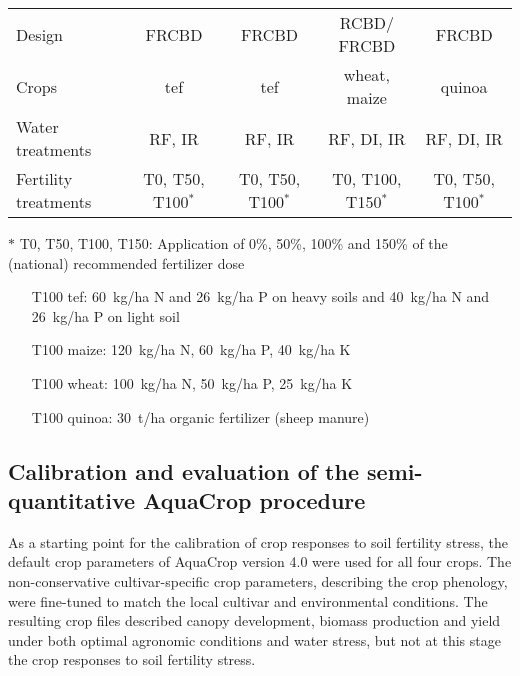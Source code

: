 \begin{landscape}
\begin{table}[htbp]
\begin{threeparttable}
\begin{tabular}{lrrrc}
Design & \multicolumn{1}{c}{FRCBD} & \multicolumn{1}{c}{FRCBD} & \multicolumn{1}{c}{RCBD/ FRCBD} & FRCBD \\
Crops & \multicolumn{1}{c}{tef} & \multicolumn{1}{c}{tef} & \multicolumn{1}{c}{wheat, maize} & quinoa \\
Water treatments & \multicolumn{1}{c}{RF, IR} & \multicolumn{1}{c}{RF, IR} & \multicolumn{1}{c}{RF, DI, IR} & RF, DI, IR \\
Fertility treatments & \multicolumn{1}{c}{T0, T50, T100$^{*}$} & \multicolumn{1}{c}{T0, T50, T100$^{*}$} & \multicolumn{1}{c}{T0, T100, T150$^{*}$} & T0, T50, T100$^{*}$ \\
\bottomrule				
    	\end{tabular}%
    	\begin{tablenotes}
        \footnotesize{
      	\item[$\ast$] T0, T50, T100, T150: Application of 0\%, 50\%, 100\% and 150\% of the (national) recommended fertilizer dose 
		\begin{itemize}
        \item[] T100 tef: \SI{60}{kg/ha} N and \SI{26}{kg/ha} P on heavy soils and \SI{40}{kg/ha} N and \SI{26}{kg/ha} P on light soil  \parencite{earo2002}
		\item[] T100 maize: \SI{120}{kg/ha} N, \SI{60}{kg/ha} P, \SI{40}{kg/ha} K \parencite{moac2010} 
		\item[] T100 wheat: \SI{100}{kg/ha} N, \SI{50}{kg/ha} P, \SI{25}{kg/ha} K \parencite{moac2010} 
		\item[] T100 quinoa: \SI{30}{t/ha} organic fertilizer (sheep manure) \parencite{miranda2012}
		\end{itemize} 
		} 
    	\end{tablenotes}
        \end{threeparttable}
  \label{tab:ch3_metExp}%
\end{table}%
\end{landscape}

\subsection{Calibration and evaluation of the semi-quantitative AquaCrop procedure}
As a starting point for the calibration of crop responses to soil fertility stress, the default crop parameters of AquaCrop version 4.0 \parencite{raes2012} were used for all four crops. The non-conservative cultivar-specific crop parameters, describing the crop phenology, were fine-tuned to match the local cultivar and environmental conditions. The resulting crop files described canopy development, biomass production and yield under both optimal agronomic conditions and water stress, but not at this stage the crop responses to soil fertility stress.

